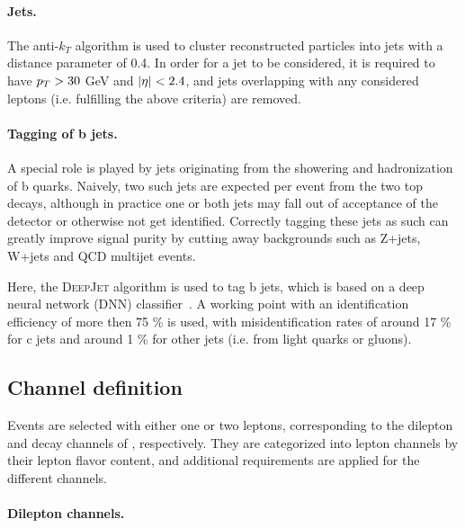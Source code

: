 \paragraph{Jets.}

The anti-$k_T$ algorithm is used to cluster reconstructed particles into jets with a distance parameter of 0.4. In order for a jet to be considered, it is required to have $p_T > 30$ GeV and $|\eta| < 2.4$, and jets overlapping with any considered leptons (i.e. fulfilling the above criteria) are removed. %

\paragraph{Tagging of b jets.}

A special role is played by jets originating from the showering and hadronization of b quarks. Naively, two such jets are expected per \ttbar event from the two top decays, although in practice one or both jets may fall out of acceptance of the detector or otherwise not get identified. Correctly tagging these jets as such can greatly improve signal purity by cutting away backgrounds such as Z+jets, W+jets and QCD multijet events.

Here, the \textsc{DeepJet} algorithm is used to tag b jets, which is based on a deep neural network (DNN) classifier~\cite{DeepJet:2020,CMS:BTV-16-002}. A working point with an identification efficiency of more then 75 \% is used, with misidentification rates of around 17 \% for c jets and around 1 \% for other jets (i.e. from light quarks or gluons).

\subsection{Channel definition}
\label{sec:ttxs:channels}

Events are selected with either one or two leptons, corresponding to the dilepton and \ljets decay channels of \ttbar, respectively. They are categorized into lepton channels by their lepton flavor content, and additional requirements are applied for the different channels. 

\paragraph{Dilepton channels.}

